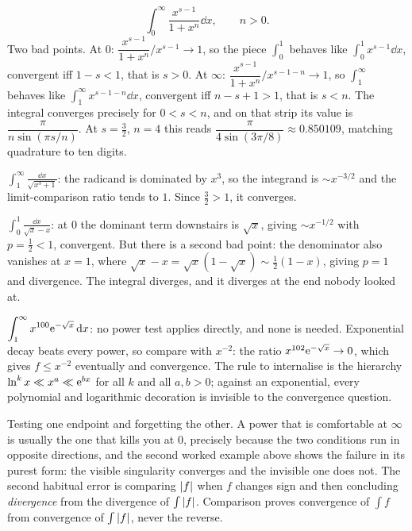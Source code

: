 \begin{worked}
\[\int_0^{\infty}\frac{x^{s-1}}{1+x^{n}}\dd x,\qquad n>0.\]
Two bad points. At $0$: $\dfrac{x^{s-1}}{1+x^{n}}\big/x^{s-1}\to1$, so the piece $\int_0^{1}$ behaves like $\int_0^{1}x^{s-1}\dd x$, convergent iff $1-s<1$, that is $s>0$. At $\infty$: $\dfrac{x^{s-1}}{1+x^{n}}\big/x^{s-1-n}\to1$, so $\int_1^{\infty}$ behaves like $\int_1^{\infty}x^{s-1-n}\dd x$, convergent iff $n-s+1>1$, that is $s<n$. The integral converges precisely for $0<s<n$, and on that strip its value is $\dfrac{\pi}{n\sin(\pi s/n)}$. At $s=\tfrac32$, $n=4$ this reads $\dfrac{\pi}{4\sin(3\pi/8)}\approx0.850109$, matching quadrature to ten digits.
\end{worked}

\begin{worked}
$\displaystyle\int_1^{\infty}\frac{\dd x}{\sqrt{x^{3}+1}}$: the radicand is dominated by $x^{3}$, so the integrand is $\sim x^{-3/2}$ and the limit-comparison ratio tends to $1$. Since $\tfrac32>1$, it converges.

$\displaystyle\int_0^{1}\frac{\dd x}{\sqrt{x}-x}$: at $0$ the dominant term downstairs is $\sqrt x$, giving $\sim x^{-1/2}$ with $p=\tfrac12<1$, convergent. But there is a second bad point: the denominator also vanishes at $x=1$, where $\sqrt x-x=\sqrt x(1-\sqrt x)\sim\tfrac12(1-x)$, giving $p=1$ and divergence. The integral diverges, and it diverges at the end nobody looked at.

$\displaystyle\int_1^{\infty}x^{100}\mathrm{e}^{-\sqrt x}\,\mathrm{d} x$: no power test applies directly, and none is needed. Exponential decay beats every power, so compare with $x^{-2}$: the ratio $x^{102}\mathrm{e}^{-\sqrt x}\to0$, which gives $f\leq x^{-2}$ eventually and convergence. The rule to internalise is the hierarchy $\ln^{k}x\ll x^{a}\ll\mathrm{e}^{bx}$ for all $k$ and all $a,b>0$; against an exponential, every polynomial and logarithmic decoration is invisible to the convergence question.
\end{worked}

\begin{trap}
Testing one endpoint and forgetting the other. A power that is comfortable at $\infty$ is usually the one that kills you at $0$, precisely because the two conditions run in opposite directions, and the second worked example above shows the failure in its purest form: the visible singularity converges and the invisible one does not. The second habitual error is comparing $\left\lvert f\right\rvert$ when $f$ changes sign and then concluding \emph{divergence} from the divergence of $\int\left\lvert f\right\rvert$. Comparison proves convergence of $\int f$ from convergence of $\int\left\lvert f\right\rvert$, never the reverse.
\end{trap}

